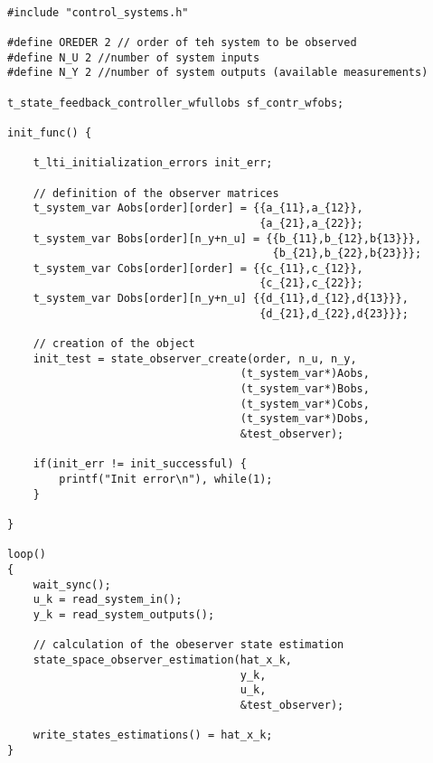 \documentclass[12pt]{Template_}
\begin{document}
\begin{verbatim}

#include "control_systems.h"

#define OREDER 2 // order of teh system to be observed
#define N_U 2 //number of system inputs
#define N_Y 2 //number of system outputs (available measurements)

t_state_feedback_controller_wfullobs sf_contr_wfobs;

init_func() {

    t_lti_initialization_errors init_err;

    // definition of the observer matrices
    t_system_var Aobs[order][order] = {{a_{11},a_{12}},
                                       {a_{21},a_{22}};
    t_system_var Bobs[order][n_y+n_u] = {{b_{11},b_{12},b{13}}},
                                         {b_{21},b_{22},b{23}}};
    t_system_var Cobs[order][order] = {{c_{11},c_{12}},
                                       {c_{21},c_{22}}; 
    t_system_var Dobs[order][n_y+n_u] {{d_{11},d_{12},d{13}}},
                                       {d_{21},d_{22},d{23}}};
    
    // creation of the object	
    init_test = state_observer_create(order, n_u, n_y,
                                    (t_system_var*)Aobs, 
                                    (t_system_var*)Bobs,
                                    (t_system_var*)Cobs,
                                    (t_system_var*)Dobs,
                                    &test_observer);
        
    if(init_err != init_successful) {
        printf("Init error\n"), while(1);
    }

}

loop() 
{
    wait_sync();
    u_k = read_system_in();
    y_k = read_system_outputs();
	
    // calculation of the obeserver state estimation
    state_space_observer_estimation(hat_x_k, 
                                    y_k, 
                                    u_k,
                                    &test_observer);
									
    write_states_estimations() = hat_x_k;
}
\end{verbatim}

\newpage
\end{document}

